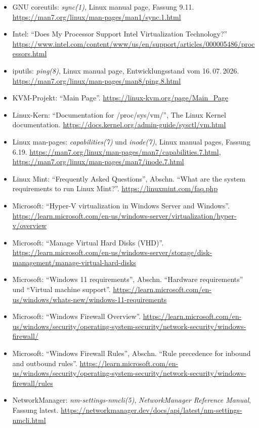\begin{itemize}[nosep]
  \item GNU coreutils: \emph{sync(1)}, Linux manual page, Fassung 9.11. \url{https://man7.org/linux/man-pages/man1/sync.1.html}
  \item Intel: \enquote{Does My Processor Support Intel Virtualization Technology?} \url{https://www.intel.com/content/www/us/en/support/articles/000005486/processors.html}
  \item iputils: \emph{ping(8)}, Linux manual page, Entwicklungsstand vom 16.\,07.\,2026. \url{https://man7.org/linux/man-pages/man8/ping.8.html}
  \item KVM-Projekt: \enquote{Main Page}. \url{https://linux-kvm.org/page/Main_Page}
  \item Linux-Kern: \enquote{Documentation for /proc/sys/vm/}, The Linux Kernel documentation. \url{https://docs.kernel.org/admin-guide/sysctl/vm.html}
  \item Linux man-pages: \emph{capabilities(7)} und \emph{inode(7)}, Linux manual pages, Fassung 6.19. \url{https://man7.org/linux/man-pages/man7/capabilities.7.html}, \url{https://man7.org/linux/man-pages/man7/inode.7.html}
  \item Linux Mint: \enquote{Frequently Asked Questions}, Abschn. \enquote{What are the system requirements to run Linux Mint?}. \url{https://linuxmint.com/faq.php}
  \item Microsoft: \enquote{Hyper-V virtualization in Windows Server and Windows}. \url{https://learn.microsoft.com/en-us/windows-server/virtualization/hyper-v/overview}
  \item Microsoft: \enquote{Manage Virtual Hard Disks (VHD)}. \url{https://learn.microsoft.com/en-us/windows-server/storage/disk-management/manage-virtual-hard-disks}
  \item Microsoft: \enquote{Windows 11 requirements}, Abschn. \enquote{Hardware requirements} und \enquote{Virtual machine support}. \url{https://learn.microsoft.com/en-us/windows/whats-new/windows-11-requirements}
  \item Microsoft: \enquote{Windows Firewall Overview}. \url{https://learn.microsoft.com/en-us/windows/security/operating-system-security/network-security/windows-firewall/}
  \item Microsoft: \enquote{Windows Firewall Rules}, Abschn. \enquote{Rule precedence for inbound and outbound rules}. \url{https://learn.microsoft.com/en-us/windows/security/operating-system-security/network-security/windows-firewall/rules}
  \item NetworkManager: \emph{nm-settings-nmcli(5)}, \emph{NetworkManager Reference Manual}, Fassung latest. \url{https://networkmanager.dev/docs/api/latest/nm-settings-nmcli.html}

\end{itemize}
